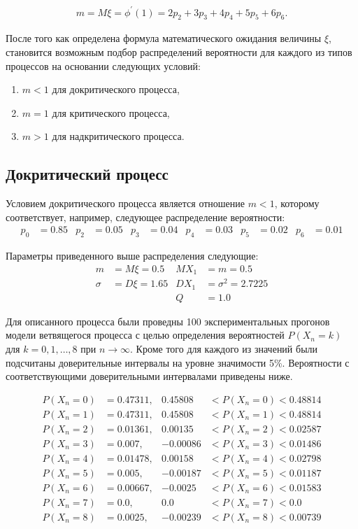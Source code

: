 \begin{align*}
    m = M\xi = \phi^{\prime}(1) = 2p_2 + 3p_3 + 4p_4 + 5p_5 + 6p_6.
\end{align*}

После того как определена формула математического ожидания величины $\xi$, становится возможным подбор распределений
вероятности для каждого из типов процессов на основании следующих условий:

\begin{enumerate}
    \item $m < 1$ для докритического процесса,
    \item $m = 1$ для критического процесса,
    \item $m > 1$ для надкритического процесса.
\end{enumerate}

\subsection*{Докритический процесс}

Условием докритического процесса является отношение $m < 1$, которому соответствует, например, следующее распределение вероятности:
\begin{align*}
    p_0 & = 0.85 & p_2 & = 0.05 & p_3 & = 0.04 & p_4 & = 0.03 & p_5 & = 0.02 & p_6 & = 0.01
\end{align*}

Параметры приведенного выше распределения следующие:
\begin{align*}
    m & = M\xi = 0.5 & MX_1 & = m = 0.5\\
    \sigma & = D\xi = 1.65 & DX_1 & = \sigma^2 = 2.7225\\
    & & Q & = 1.0
\end{align*}

Для описанного процесса были проведны 100 экспериментальных прогонов модели ветвящегося процесса с целью определения
вероятностей $P(X_n=k)$ для $k=0,1,\dots,8$ при $n\rightarrow\infty$.
Кроме того для каждого из значений были подсчитаны доверительные интервалы на уровне значимости 5\%.
Вероятности с соответствующими доверительными интервалами приведены ниже.

\begin{align*}
P(X_n = 0) & = 0.47311, & 0.45808 & < P(X_n = 0) < 0.48814\\
P(X_n = 1) & = 0.47311, & 0.45808 & < P(X_n = 1) < 0.48814\\
P(X_n = 2) & = 0.01361, & 0.00135 & < P(X_n = 2) < 0.02587\\
P(X_n = 3) & = 0.007, & -0.00086 & < P(X_n = 3) < 0.01486\\
P(X_n = 4) & = 0.01478, & 0.00158 & < P(X_n = 4) < 0.02798\\
P(X_n = 5) & = 0.005, & -0.00187 & < P(X_n = 5) < 0.01187\\
P(X_n = 6) & = 0.00667, & -0.0025 & < P(X_n = 6) < 0.01583\\
P(X_n = 7) & = 0.0, & 0.0 & < P(X_n = 7) < 0.0\\
P(X_n = 8) & = 0.0025, & -0.00239 & < P(X_n = 8) < 0.00739
\end{align*}

